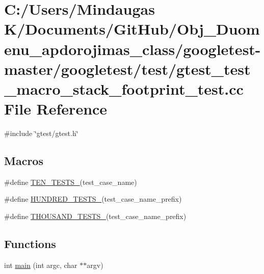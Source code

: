\hypertarget{googletest-master_2googletest_2test_2gtest__test__macro__stack__footprint__test_8cc}{}\section{C\+:/\+Users/\+Mindaugas K/\+Documents/\+Git\+Hub/\+Obj\+\_\+\+Duomenu\+\_\+apdorojimas\+\_\+class/googletest-\/master/googletest/test/gtest\+\_\+test\+\_\+macro\+\_\+stack\+\_\+footprint\+\_\+test.cc File Reference}
\label{googletest-master_2googletest_2test_2gtest__test__macro__stack__footprint__test_8cc}
{\ttfamily \#include \char`\"{}gtest/gtest.\+h\char`\"{}}\newline
\subsection*{Macros}
\begin{DoxyCompactItemize}
\item 
\#define \mbox{\hyperlink{googletest-master_2googletest_2test_2gtest__test__macro__stack__footprint__test_8cc_a5ec4fbf93965ff2608810fa9fa15d824}{T\+E\+N\+\_\+\+T\+E\+S\+T\+S\+\_\+}}(test\+\_\+case\+\_\+name)
\item 
\#define \mbox{\hyperlink{googletest-master_2googletest_2test_2gtest__test__macro__stack__footprint__test_8cc_a27c403ca1878ce98fe3268318abee273}{H\+U\+N\+D\+R\+E\+D\+\_\+\+T\+E\+S\+T\+S\+\_\+}}(test\+\_\+case\+\_\+name\+\_\+prefix)
\item 
\#define \mbox{\hyperlink{googletest-master_2googletest_2test_2gtest__test__macro__stack__footprint__test_8cc_a9671fd1d134f54e8295001098cff7810}{T\+H\+O\+U\+S\+A\+N\+D\+\_\+\+T\+E\+S\+T\+S\+\_\+}}(test\+\_\+case\+\_\+name\+\_\+prefix)
\end{DoxyCompactItemize}
\subsection*{Functions}
\begin{DoxyCompactItemize}
\item 
int \mbox{\hyperlink{googletest-master_2googletest_2test_2gtest__test__macro__stack__footprint__test_8cc_a3c04138a5bfe5d72780bb7e82a18e627}{main}} (int argc, char $\ast$$\ast$argv)
\end{DoxyCompactItemize}


